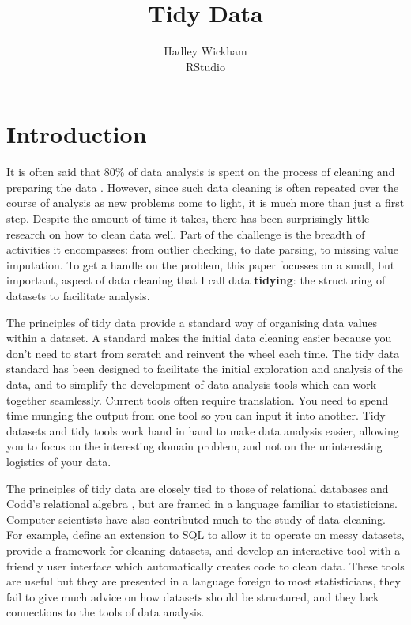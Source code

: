 \documentclass[article]{jss}
\author{Hadley Wickham\\RStudio}
\title{Tidy Data}
\begin{document}
\maketitle

\section{Introduction}

It is often said that 80\% of data analysis is spent on the process of cleaning and preparing the data \citep{dasu:2003}. However, since such data cleaning is often repeated over the course of analysis as new problems come to light, it is much more than just a first step. Despite the amount of time it takes, there has been surprisingly little research on how to clean data well. Part of the challenge is the breadth of activities it encompasses: from outlier checking, to date parsing, to missing value imputation. To get a handle on the problem, this paper focusses on a small, but important, aspect of data cleaning that I call data \textbf{tidying}: the structuring of datasets to facilitate analysis.

The principles of tidy data provide a standard way of organising data values within a dataset. A standard makes the initial data cleaning easier because you don't need to start from scratch and reinvent the wheel each time. The tidy data standard has been designed to facilitate the initial exploration and analysis of the data, and to simplify the development of data analysis tools which can work together seamlessly. Current tools often require translation. You need to spend time munging the output from one tool so you can input it into another. Tidy datasets and tidy tools work hand in hand to make data analysis easier, allowing you to focus on the interesting domain problem, and not on the uninteresting logistics of your data.

The principles of tidy data are closely tied to those of relational databases and Codd's relational algebra \citep{codd:1990}, but are framed in a language familiar to statisticians. Computer scientists have also contributed much to the study of data cleaning. For example, \citet{lakshmanan:1996} define an extension to SQL to allow it to operate on messy datasets, \citet{raman:2001} provide a framework for cleaning datasets, and \citet{kandel:2011} develop an interactive tool with a friendly user interface which automatically creates code to clean data. These tools are useful but they are presented in a language foreign to most statisticians, they fail to give much advice on how datasets should be structured, and they lack connections to the tools of data analysis.
\end{document}
